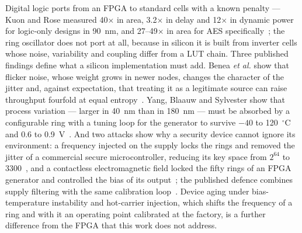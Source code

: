Digital logic ports from an FPGA to standard cells with a known penalty
--- Kuon and Rose measured 40$\times$ in area, 3.2$\times$ in delay and
12$\times$ in dynamic power for logic-only designs in 90~nm, and 27--49$\times$
in area for AES specifically~\cite{kuon2006}; the ring oscillator does not
port at all, because in silicon it is built from inverter cells whose
noise, variability and coupling differ from a LUT chain. Three published
findings define what a silicon implementation must add. Benea
\emph{et al.} show that flicker noise, whose weight grows in newer nodes,
changes the character of the jitter and, against expectation, that
treating it as a legitimate source can raise throughput fourfold at equal
entropy~\cite{benea_2024_flicker}. Yang, Blaauw and Sylvester show that
process variation --- larger in 40~nm than in 180~nm --- must be absorbed
by a configurable ring with a tuning loop for the generator to survive
$-40$ to 120~$^\circ$C and 0.6 to 0.9~V~\cite{yang_2016_jssc}. And two
attacks show why a security device cannot ignore its environment: a
frequency injected on the supply locks the rings and removed the jitter
of a commercial secure microcontroller, reducing its key space from
$2^{64}$ to 3300~\cite{markettos_2009_frequency}, and a contactless
electromagnetic field locked the fifty rings of an FPGA generator
and controlled the bias of its output~\cite{bayon_2012_contactless}; the
published defence
combines supply filtering with the same calibration loop~\cite{yang_2016_jssc}.
Device aging under bias-temperature instability and hot-carrier
injection, which shifts the frequency of a ring and with it an operating
point calibrated at the factory, is a further difference from the
FPGA that this work does not address.

